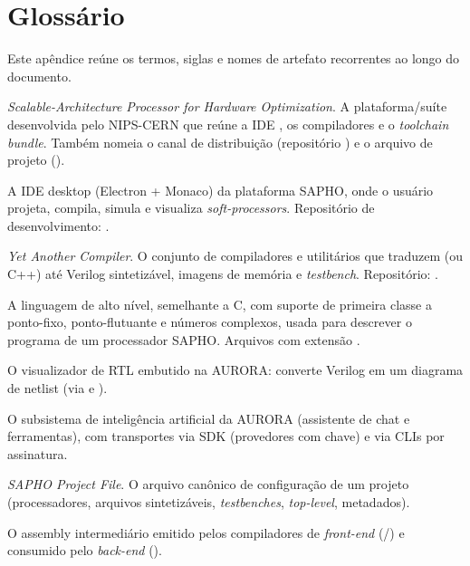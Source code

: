 \chapter{Glossário}
\label{ap:glossario}

Este apêndice reúne os termos, siglas e nomes de artefato recorrentes ao longo do documento.

\begin{description}[style=nextline,leftmargin=0pt,font=\bfseries\ttfamily]

\item[SAPHO] \textit{Scalable-Architecture Processor for Hardware Optimization}. A plataforma/suíte
desenvolvida pelo NIPS-CERN que reúne a IDE , os compiladores  e o
\textit{toolchain bundle}. Também nomeia o canal de distribuição (repositório ) e o
arquivo de projeto ().

\item[AURORA] A IDE desktop (Electron + Monaco) da plataforma SAPHO, onde o usuário projeta,
compila, simula e visualiza \textit{soft-processors}. Repositório de desenvolvimento: .

\item[YANC] \textit{Yet Another Compiler}. O conjunto de compiladores e utilitários que traduzem
\cmm{} (ou C++) até Verilog sintetizável, imagens de memória e \textit{testbench}. Repositório:
.

\item[\cmm{} (CMM)] A linguagem de alto nível, semelhante a C, com suporte de primeira classe a
ponto-fixo, ponto-flutuante e números complexos, usada para descrever o programa de um processador
SAPHO. Arquivos com extensão .

\item[PRISM] O visualizador de RTL embutido na AURORA: converte Verilog em um diagrama de netlist
(via  e ).

\item[Aurora Intelligence] O subsistema de inteligência artificial da AURORA (assistente de chat e
ferramentas), com transportes via SDK (provedores com chave) e via CLIs por assinatura.

\item[\file{.spf}] \textit{SAPHO Project File}. O arquivo canônico de configuração de um projeto
(processadores, arquivos sintetizáveis, \textit{testbenches}, \textit{top-level}, metadados).

\item[\file{.asm}] O assembly intermediário emitido pelos compiladores de \textit{front-end}
(/) e consumido pelo \textit{back-end} ().


\end{description}
